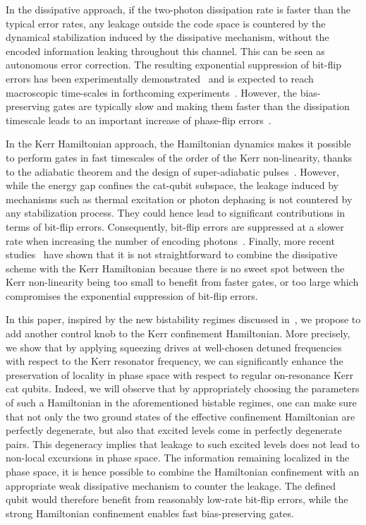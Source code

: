 \documentclass[%
 reprint,
 superscriptaddress,
 amsmath,
 amssymb,
 aps,
 pra,
 10pt
]{revtex4-2}
\begin{document}
In the dissipative approach, if the two-photon dissipation rate is faster than the typical error rates, any leakage outside  the code space is countered by the dynamical stabilization induced by the dissipative mechanism, without the encoded information leaking throughout this channel. This can be seen as autonomous error correction. The  resulting exponential suppression of bit-flip errors has been experimentally demonstrated~\cite{Lescanne2020} and is expected to reach macroscopic time-scales in forthcoming experiments~\cite{Berdou2022,gravina2022critical,wang2016schrodinger}. However, the bias-preserving gates are typically slow and making them faster than the dissipation timescale leads to an important increase of phase-flip errors~\cite{Guillaud2019}. 

In the Kerr Hamiltonian approach, the Hamiltonian dynamics makes it possible to perform gates in fast timescales of the order of the Kerr non-linearity, thanks to the adiabatic theorem and the design of super-adiabatic pulses~\cite{Xu2021}. However, while the energy gap confines the cat-qubit subspace, the leakage induced by mechanisms such as thermal excitation or photon dephasing is not countered by any stabilization process. They could hence lead to significant contributions in terms of bit-flip errors. Consequently, bit-flip errors are suppressed at a slower rate when increasing the number of encoding photons~\cite{Putterman2022,Gautier2022,Frattini-2022}. Finally, more recent studies~\cite{Gautier2022} have shown that it is not straightforward to combine the dissipative scheme with the Kerr Hamiltonian because there is no sweet spot between the Kerr non-linearity being too small to benefit from faster gates, or too large which compromises the exponential suppression of bit-flip errors. 

In this paper, inspired by the new bistability regimes discussed in~\cite{Roberts2019}, we propose to add another control knob to the Kerr confinement Hamiltonian. More precisely, we show that by applying squeezing drives at well-chosen detuned frequencies with respect to the Kerr resonator frequency, we can significantly enhance the preservation of locality in phase space with respect to regular on-resonance Kerr cat qubits. Indeed, we will observe that by appropriately choosing the parameters of such a Hamiltonian in the aforementioned bistable regimes, one can make sure that not only the two ground states of the effective confinement Hamiltonian are perfectly degenerate, but also that excited levels  come in perfectly degenerate pairs. This degeneracy implies that leakage to such excited levels does not lead to non-local excursions in phase space. The information remaining localized in the phase space, it is hence possible to combine the Hamiltonian confinement with an appropriate weak dissipative mechanism to counter the leakage. The defined qubit would therefore benefit from reasonably low-rate bit-flip errors, while the strong Hamiltonian confinement enables fast bias-preserving gates.  
\end{document}
